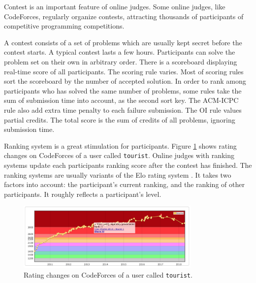             Contest is an important feature of online judges.
            Some online judges, like CodeForces, regularly organize contests,
            attracting thousands of participants of competitive programming competitions.

            A contest consists of a set of problems
            which are usually kept secret before the contest starts.
            A typical contest lasts a few hours.
            Participants can solve the problem set on their own in arbitrary order.
            There is a scoreboard displaying real-time score of all participants.
            The scoring rule varies.
            Most of scoring rules sort the scoreboard by the number of accepted solution.
            In order to rank among participants who has solved the same number of problems,
            some rules take the sum of submission time into account, as the second sort key.
            The ACM-ICPC rule also add extra time penalty to each failure submission.
            The OI rule values partial credits.
            The total score is the sum of credits of all problems, ignoring submission time.

            Ranking system is a great stimulation for participants.
            Figure \ref{fig:codeforces-rating} shows rating changes on CodeForces of a user called \texttt{tourist}.
            Online judges with ranking systems update each participants ranking score
            after the contest has finished.
            The ranking systems are usually variants \cite{bailey_algorithm_2018,mirzayanov_open_2015}
            of the Elo rating system \cite{elo1978rating}.
            It takes two factors into account:
            the participant's current ranking, and the ranking of other participants.
            It roughly reflects a participant's level.

            \begin{figure}[htp]
                \centering
                \includegraphics[width=0.8\textwidth]{img/codeforces-rating.png}
                \caption{Rating changes on CodeForces of a user called \texttt{tourist}.}
                \label{fig:codeforces-rating}
            \end{figure}

